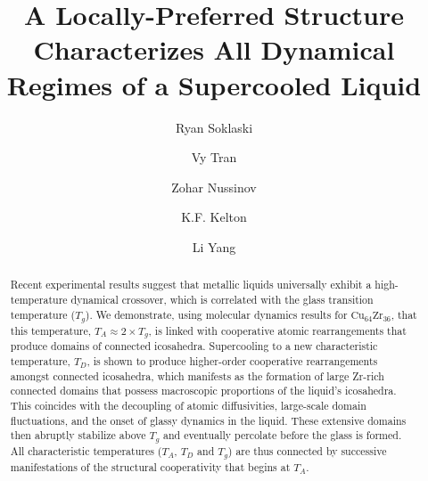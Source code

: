 \documentclass[aps,prl,preprint,showpacs,amsmath,floatfix,superscriptaddress]{revtex4}
\begin{document}
\title{A Locally-Preferred Structure Characterizes All Dynamical Regimes of a Supercooled Liquid}

\author{Ryan Soklaski}
\author{Vy Tran}
\author{Zohar Nussinov}
\author{K.F. Kelton}
\author{Li Yang}
\date{}

\begin{abstract}
Recent experimental results suggest that metallic liquids
universally exhibit a high-temperature dynamical crossover, which
is correlated with the glass transition temperature ($T_{g}$). We
demonstrate, using molecular dynamics results for
$\mathrm{Cu_{64}Zr_{36}}$, that this temperature, $T_{A} \approx 2
\times T_{g}$, is linked with cooperative atomic rearrangements
that produce domains of connected icosahedra. Supercooling to a
new characteristic temperature, $T_{D}$, is shown to produce
higher-order cooperative rearrangements amongst connected
icosahedra, which manifests as the formation of large Zr-rich connected domains
that possess macroscopic proportions of the liquid's icosahedra.
This coincides with the decoupling of atomic diffusivities, 
large-scale domain fluctuations, and the onset of glassy dynamics in the liquid. 
These extensive domains then abruptly
stabilize above $T_{g}$ and eventually percolate before the glass
is formed. All characteristic temperatures ($T_{A}$, $T_{D}$ and
$T_{g}$) are thus connected by successive manifestations of the
structural cooperativity that begins at $T_{A}$.
\end{abstract}

\maketitle
\end{document}
